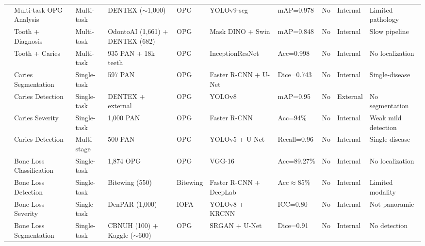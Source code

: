 \documentclass[conference]{IEEEtran}
\begin{document}
\begin{table}[t]
\begin{tabular}{p{0.5cm} p{2.0cm} p{1.3cm} p{2.2cm} p{1.1cm} p{2.4cm} p{1.6cm} p{0.6cm} p{1.3cm} p{2.2cm}}
\cite{nassiri2025yolo}           & Multi-task OPG Analysis      & Multi-task  & DENTEX ($\sim$1,000)            & OPG      & YOLOv9-seg              & mAP=0.978        & No      & Internal & Limited pathology \\
\cite{vannistelrooij2024combining}& Tooth + Diagnosis            & Multi-task  & OdontoAI (1,661) + DENTEX (682) & OPG      & Mask DINO + Swin        & mAP=0.848        & No      & Internal & Slow pipeline \\
\cite{zancan2025ai}              & Tooth + Caries               & Multi-task  & 935 PAN + 18k teeth             & OPG      & InceptionResNet         & Acc=0.998        & No      & Internal & No localization \\
\cite{lim2024dual}               & Caries Segmentation          & Single-task & 597 PAN                         & OPG      & Faster R-CNN + U-Net    & Dice=0.743       & No      & Internal & Single-disease \\
\cite{bizjak2024advancing}       & Caries Detection             & Single-task & DENTEX + external               & OPG      & YOLOv8                  & mAP=0.95         & No      & External & No segmentation \\
\cite{asadi2024detection}        & Caries Severity              & Single-task & 1,000 PAN                       & OPG      & Faster R-CNN            & Acc=94\%         & No      & Internal & Weak mild detection \\
\cite{pornprasertsuk2025clinical}& Caries Detection             & Multi-stage & 500 PAN                         & OPG      & YOLOv5 + U-Net          & Recall=0.96      & No      & Internal & Single-disease \\
\cite{mathur2025comparative}     & Bone Loss Classification     & Single-task & 1,874 OPG                       & OPG      & VGG-16                  & Acc=89.27\%      & No      & Internal & No localization \\
\cite{lee2025evaluation}         & Bone Loss Detection          & Single-task & Bitewing (550)                  & Bitewing & Faster R-CNN + DeepLab  & Acc$\approx$85\% & No      & Internal & Limited modality \\
\cite{wimalasiri2025ai}          & Bone Loss Severity           & Single-task & DenPAR (1,000)                  & IOPA     & YOLOv8 + KRCNN          & ICC=0.80         & No      & Internal & Not panoramic \\
\cite{kong2024integrating}       & Bone Loss Segmentation       & Single-task & CBNUH (100) + Kaggle ($\sim$600)& OPG      & SRGAN + U-Net           & Dice=0.91        & No      & Internal & No detection \\

\end{tabular}
\end{table}
\end{document}
